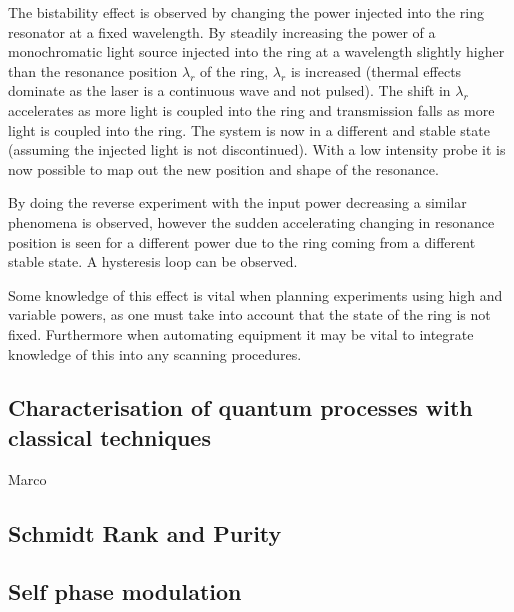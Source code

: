 The bistability effect is observed by changing the power injected into the ring resonator at a fixed wavelength. By steadily increasing the power of a monochromatic light source injected into the ring at a wavelength slightly higher than the resonance position $\lambda_{r}$ of the ring, $\lambda_{r}$ is increased (thermal effects dominate as the laser is a continuous wave and not pulsed). The shift in $\lambda_{r}$ accelerates as more light is coupled into the ring and transmission falls as more light is coupled into the ring. The system is now in a different and stable state (assuming the injected light is not discontinued). With a low intensity probe it is now possible to map out the new position and shape of the resonance.

By doing the reverse experiment with the input power decreasing a similar phenomena is observed, however the sudden accelerating changing in resonance position is seen for a different power due to the ring coming from a different stable state. A hysteresis loop can be observed.

Some knowledge of this effect is vital when planning experiments using high and variable powers, as one must take into account that the state of the ring is not fixed. Furthermore when automating equipment it may be vital to integrate knowledge of this into any scanning procedures. 

\subsection{Characterisation of quantum processes with classical techniques}
Marco \cite{helt_spontaneous_2010}

\subsection{Schmidt Rank and Purity}

\subsection{Self phase modulation}